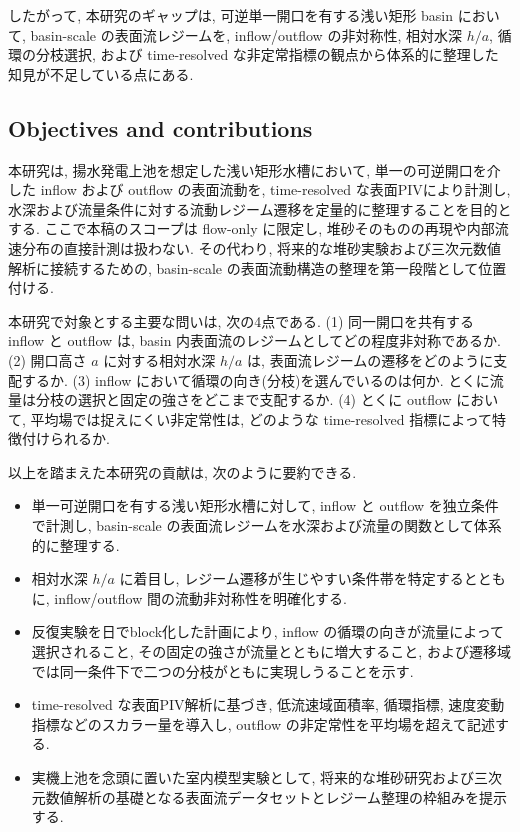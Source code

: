 したがって, 本研究のギャップは, 可逆単一開口を有する浅い矩形 basin において, basin-scale の表面流レジームを, inflow/outflow の非対称性, 相対水深 $h/a$, 循環の分枝選択, および time-resolved な非定常指標の観点から体系的に整理した知見が不足している点にある.

\subsection{Objectives and contributions}

本研究は, 揚水発電上池を想定した浅い矩形水槽において, 単一の可逆開口を介した inflow および outflow の表面流動を, time-resolved な表面PIVにより計測し, 水深および流量条件に対する流動レジーム遷移を定量的に整理することを目的とする. ここで本稿のスコープは flow-only に限定し, 堆砂そのものの再現や内部流速分布の直接計測は扱わない. その代わり, 将来的な堆砂実験および三次元数値解析に接続するための, basin-scale の表面流動構造の整理を第一段階として位置付ける.

本研究で対象とする主要な問いは, 次の4点である.
(1) 同一開口を共有する inflow と outflow は, basin 内表面流のレジームとしてどの程度非対称であるか.
(2) 開口高さ $a$ に対する相対水深 $h/a$ は, 表面流レジームの遷移をどのように支配するか.
(3) inflow において循環の向き(分枝)を選んでいるのは何か. とくに流量は分枝の選択と固定の強さをどこまで支配するか.
(4) とくに outflow において, 平均場では捉えにくい非定常性は, どのような time-resolved 指標によって特徴付けられるか.

以上を踏まえた本研究の貢献は, 次のように要約できる.
\begin{itemize}
  \item 単一可逆開口を有する浅い矩形水槽に対して, inflow と outflow を独立条件で計測し, basin-scale の表面流レジームを水深および流量の関数として体系的に整理する.
  \item 相対水深 $h/a$ に着目し, レジーム遷移が生じやすい条件帯を特定するとともに, inflow/outflow 間の流動非対称性を明確化する.
  \item 反復実験を日でblock化した計画により, inflow の循環の向きが流量によって選択されること, その固定の強さが流量とともに増大すること, および遷移域では同一条件下で二つの分枝がともに実現しうることを示す.
  \item time-resolved な表面PIV解析に基づき, 低流速域面積率, 循環指標, 速度変動指標などのスカラー量を導入し, outflow の非定常性を平均場を超えて記述する.
  \item 実機上池を念頭に置いた室内模型実験として, 将来的な堆砂研究および三次元数値解析の基礎となる表面流データセットとレジーム整理の枠組みを提示する.
\end{itemize}
